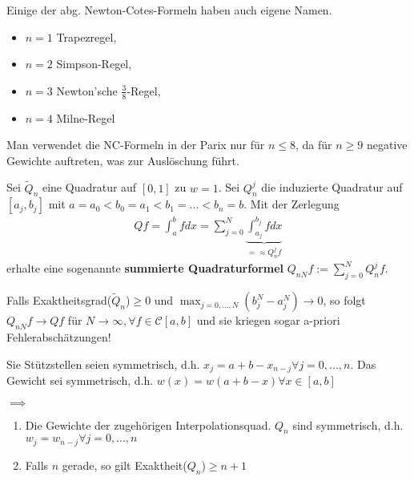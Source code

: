 \begin{remark}
	Einige der abg. Newton-Cotes-Formeln haben auch eigene Namen.
	\begin{itemize}
		\item $n=1$ Trapezregel,
		\item $n=2$ Simpson-Regel,
		\item $n=3$ Newton'sche $\frac{3}{8}$-Regel,
		\item $n=4$ Milne-Regel
	\end{itemize}
\end{remark}

\begin{remark}
	Man verwendet die NC-Formeln in der Parix nur für $n \leq 8$, da für $n \geq 9$ negative Gewichte auftreten, was zur Auslöschung führt.
\end{remark}

\begin{remark}
	Sei $\tilde{Q}_n$ eine Quadratur auf $[0, 1]$ zu $w = 1$. Sei $Q_n^j$ die induzierte Quadratur auf $[a_j, b_j]$ mit $a = a_0 < b_0 = a_1 < b_1 = ... < b_n = b$. Mit der Zerlegung
	\begin{align*}
		Qf = \int_{a}^{b} f dx = \sum_{j=0}^{N} \underbrace{\int_{a_j}^{b_j} f dx}_{=\approx Q_n^jf}
	\end{align*}
	erhalte eine sogenannte \textbf{summierte Quadraturformel} $Q_{nN}f := \sum_{j=0}^{N} Q_n^jf$.
	
	Falls Exaktheitsgrad($\tilde{Q}_n$)$\geq 0$ und $\max_{j=0, ..., N}(b_j^N - a_j^N) \rightarrow 0$, so folgt $Q_{nN}f \rightarrow Qf$ für $N \rightarrow \infty, \forall f \in \mathcal{C}[a,b]$ und sie kriegen sogar a-priori Fehlerabschätzungen!
\end{remark}

\begin{theorem}
	Sie Stützstellen seien symmetrisch, d.h. $x_j = a + b - x_{n-j} \forall j=0, ..., n$. Das Gewicht sei symmetrisch, d.h. $w(x) = w(a+b-x) \forall x \in [a,b]$
	
	$\implies$
	\begin{enumerate}
		\item Die Gewichte der zugehörigen Interpolationsquad. $Q_n$ sind symmetrisch, d.h. $w_j = w_{n-j} \forall j=0, ..., n$
		\item Falls $n$ gerade, so gilt Exaktheit($Q_n$)$\geq n+1$
	\end{enumerate}
\end{theorem}

